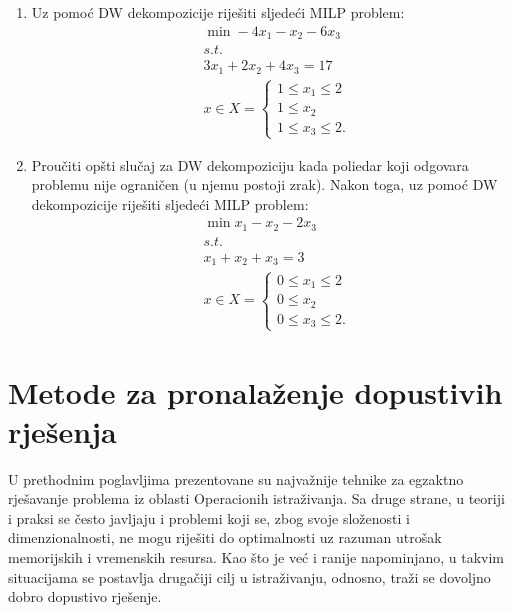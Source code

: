 \documentclass[a4paper, utf8, 11pt, colorlinks]{book}
\theoremstyle{definition}
\begin{document}
\begin{enumerate}
\item %
	Uz pomoć   DW dekompozicije riješiti sljedeći MILP problem:
\begin{align*}
	 &\min -4x_1 - x_2 - 6 x_3 \\
	 & s.t.\\
	 & 3 x_1 + 2 x_2 + 4 x_3 = 17 \\
	 & x \in X = \begin{cases}
	 	1 \leq x_1 \leq 2 \\
	 	1 \leq x_2 \\
	    1 \leq x_3 \leq 2. 
	 \end{cases}
\end{align*}
\item %
    Proučiti opšti slučaj za DW dekompoziciju kada poliedar koji odgovara problemu nije ograničen (u njemu postoji zrak). Nakon toga, uz pomoć DW dekompozicije riješiti sljedeći MILP problem:
	\begin{align*}
		 &\min x_1 - x_2 - 2 x_3 \\
		 & s.t. \\
		 & x_1 + x_2 + x_3 = 3 \\
		 & x \in X = \begin{cases}
		 	        0 \leq x_1 \leq 2 \\
		 	        0 \leq x_2 \\
		 	        0 \leq x_3 \leq 2. 
		 \end{cases}
	\end{align*}

\end{enumerate}



 \chapter{Metode za pronalaženje dopustivih rješenja}\label{chp:heuristike}
 
 U prethodnim poglavljima prezentovane su najvažnije tehnike za egzaktno rješavanje problema iz oblasti Operacionih istraživanja. Sa druge strane, u teoriji i praksi se često javljaju i problemi koji se, zbog svoje složenosti i dimenzionalnosti, ne mogu riješiti do optimalnosti uz razuman utrošak memorijskih i vremenskih resursa. Kao što je već i ranije napominjano, u takvim situacijama se postavlja drugačiji cilj u istraživanju, odnosno, traži se dovoljno dobro dopustivo rješenje. 
 
\end{document}
